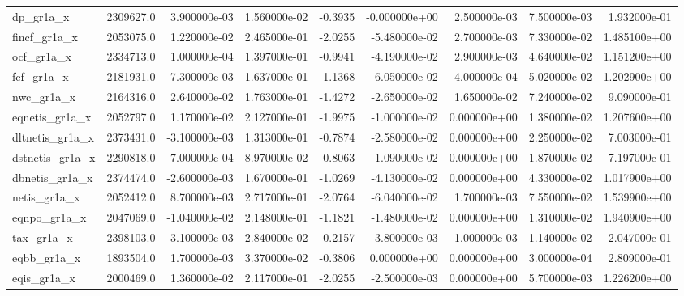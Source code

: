\documentclass[12pt]{article}
\begin{document}
\begin{landscape}
\begin{longtable}{|l|r|r|r|r|r|r|r|r|}
dp\_gr1a\_x               &  2309627.0 &  3.900000e-03 &  1.560000e-02 &     -0.3935 & -0.000000e+00 &  2.500000e-03 &  7.500000e-03 &  1.932000e-01 \\
fincf\_gr1a\_x            &  2053075.0 &  1.220000e-02 &  2.465000e-01 &     -2.0255 & -5.480000e-02 &  2.700000e-03 &  7.330000e-02 &  1.485100e+00 \\
ocf\_gr1a\_x              &  2334713.0 &  1.000000e-04 &  1.397000e-01 &     -0.9941 & -4.190000e-02 &  2.900000e-03 &  4.640000e-02 &  1.151200e+00 \\
fcf\_gr1a\_x              &  2181931.0 & -7.300000e-03 &  1.637000e-01 &     -1.1368 & -6.050000e-02 & -4.000000e-04 &  5.020000e-02 &  1.202900e+00 \\
nwc\_gr1a\_x              &  2164316.0 &  2.640000e-02 &  1.763000e-01 &     -1.4272 & -2.650000e-02 &  1.650000e-02 &  7.240000e-02 &  9.090000e-01 \\
eqnetis\_gr1a\_x          &  2052797.0 &  1.170000e-02 &  2.127000e-01 &     -1.9975 & -1.000000e-02 &  0.000000e+00 &  1.380000e-02 &  1.207600e+00 \\
dltnetis\_gr1a\_x         &  2373431.0 & -3.100000e-03 &  1.313000e-01 &     -0.7874 & -2.580000e-02 &  0.000000e+00 &  2.250000e-02 &  7.003000e-01 \\
dstnetis\_gr1a\_x         &  2290818.0 &  7.000000e-04 &  8.970000e-02 &     -0.8063 & -1.090000e-02 &  0.000000e+00 &  1.870000e-02 &  7.197000e-01 \\
dbnetis\_gr1a\_x          &  2374474.0 & -2.600000e-03 &  1.670000e-01 &     -1.0269 & -4.130000e-02 &  0.000000e+00 &  4.330000e-02 &  1.017900e+00 \\
netis\_gr1a\_x            &  2052412.0 &  8.700000e-03 &  2.717000e-01 &     -2.0764 & -6.040000e-02 &  1.700000e-03 &  7.550000e-02 &  1.539900e+00 \\
eqnpo\_gr1a\_x            &  2047069.0 & -1.040000e-02 &  2.148000e-01 &     -1.1821 & -1.480000e-02 &  0.000000e+00 &  1.310000e-02 &  1.940900e+00 \\
tax\_gr1a\_x              &  2398103.0 &  3.100000e-03 &  2.840000e-02 &     -0.2157 & -3.800000e-03 &  1.000000e-03 &  1.140000e-02 &  2.047000e-01 \\
eqbb\_gr1a\_x             &  1893504.0 &  1.700000e-03 &  3.370000e-02 &     -0.3806 &  0.000000e+00 &  0.000000e+00 &  3.000000e-04 &  2.809000e-01 \\
eqis\_gr1a\_x             &  2000469.0 &  1.360000e-02 &  2.117000e-01 &     -2.0255 & -2.500000e-03 &  0.000000e+00 &  5.700000e-03 &  1.226200e+00 \\

\end{longtable}
\end{landscape}
\end{document}
